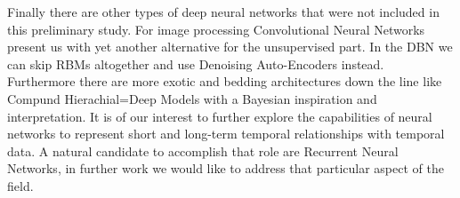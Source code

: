 \documentclass[11pt,a4paper]{article}
\begin{document}
Finally there are other types of deep neural networks that were not included in this preliminary study. For image processing Convolutional Neural Networks present us with yet another alternative for the unsupervised part. In the DBN we can skip RBMs altogether and use Denoising Auto-Encoders instead. Furthermore there are more exotic and bedding architectures down the line like Compund Hierachial=Deep Models with a Bayesian inspiration and interpretation. It is of our interest to further explore the capabilities of neural networks to represent short and long-term temporal relationships with temporal data. A natural candidate to accomplish that role are Recurrent Neural Networks, in further work we would like to address that particular aspect of the field. 



\end{document}

